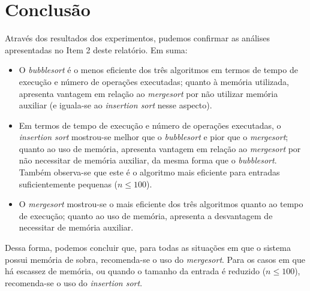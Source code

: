 \documentclass[fontsize=10pt]{article}
\begin{document}
\section{Conclusão}
    
\quad Através dos resultados dos experimentos, pudemos confirmar as análises apresentadas no Item 2 deste relatório. Em suma:

\begin{itemize}
    \item O \textit{bubblesort} é o menos eficiente dos três algoritmos em termos de tempo de execução e número de operações executadas; quanto à memória utilizada, apresenta vantagem em relação ao \textit{mergesort} por não utilizar memória auxiliar (e iguala-se ao \textit{insertion sort} nesse aspecto).
    
    \item Em termos de tempo de execução e número de operações executadas, o \textit{insertion sort} mostrou-se melhor que o \textit{bubblesort} e pior que o \textit{mergesort}; quanto ao uso de memória, apresenta vantagem em relação ao \textit{mergesort} por não necessitar de memória auxiliar, da mesma forma que o \textit{bubblesort}. Também observa-se que este é o algoritmo mais eficiente para entradas suficientemente pequenas ($n \leq 100$).
    
    \item O \textit{mergesort} mostrou-se o mais eficiente dos três algoritmos quanto ao tempo de execução; quanto ao uso de memória, apresenta a desvantagem de necessitar de memória auxiliar.
\end{itemize}

Dessa forma, podemos concluir que, para todas as situações em que o sistema possui memória de sobra, recomenda-se o uso do \textit{mergesort}. Para os casos em que há escassez de memória, ou quando o tamanho da entrada é reduzido ($n \leq 100$), recomenda-se o uso do \textit{insertion sort}.


\nocite{*}


\end{document}
